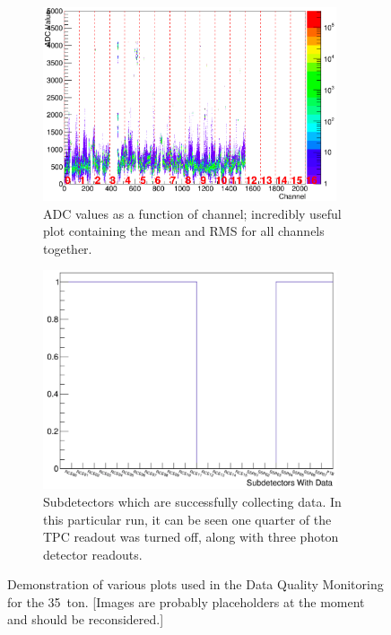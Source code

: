 \begin{figure}
\begin{subfigure}[t]{0.48\linewidth}
    \centering
    \includegraphics[width=0.95\textwidth]{DQM3.png}
    \caption{ADC values as a function of channel; incredibly useful plot containing the mean and RMS for all channels together.}
    \label{fig:DQMPlot3}
  \end{subfigure}
  \begin{subfigure}[t]{0.48\linewidth}
    \centering
    \includegraphics[width=0.95\textwidth]{DQM4.png}
    \caption{Subdetectors which are successfully collecting data.  In this particular run, it can be seen one quarter of the TPC readout was turned off, along with three photon detector readouts.}
    \label{fig:DQMPlot4}
  \end{subfigure}
  \caption[Selection of Data Quality Monitoring figures]{Demonstration of various plots used in the Data Quality Monitoring for the 35~ton. [Images are probably placeholders at the moment and should be reconsidered.]}
  \label{fig:DQMPlots}
\end{figure}

